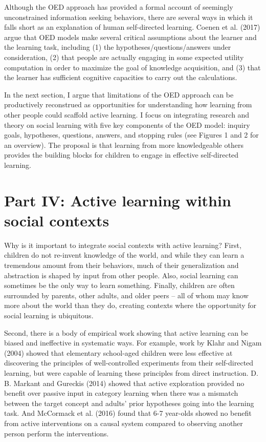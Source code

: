 \documentclass[english,floatsintext,man]{apa6}
\theoremstyle{definition}
\theoremstyle{definition}
\theoremstyle{definition}
\theoremstyle{remark}
\begin{document}
Although the OED approach has provided a formal account of seemingly
unconstrained information seeking behaviors, there are several ways in
which it falls short as an explanation of human self-directed learning.
Coenen et al. (2017) argue that OED models make several critical
assumptions about the learner and the learning task, including (1) the
hypotheses/questions/answers under consideration, (2) that people are
actually engaging in some expected utility computation in order to
maximize the goal of knowledge acquisition, and (3) that the learner has
sufficient cognitive capacities to carry out the calculations.

In the next section, I argue that limitations of the OED approach can be
productively reconstrued as opportunities for understanding how learning
from other people could scaffold active learning. I focus on integrating
research and theory on social learning with five key components of the
OED model: inquiry goals, hypotheses, questions, answers, and stopping
rules (see Figures 1 and 2 for an overview). The proposal is that
learning from more knowledgeable others provides the building blocks for
children to engage in effective self-directed learning.

\hypertarget{p4}{\section{Part IV: Active learning within social
contexts}\label{p4}}

Why is it important to integrate social contexts with active learning?
First, children do not re-invent knowledge of the world, and while they
can learn a tremendous amount from their behaviors, much of their
generalization and abstraction is shaped by input from other people.
Also, social learning can sometimes be the only way to learn something.
Finally, children are often surrounded by parents, other adults, and
older peers -- all of whom may know more about the world than they do,
creating contexts where the opportunity for social learning is
ubiquitous.

Second, there is a body of empirical work showing that active learning
can be biased and ineffective in systematic ways. For example, work by
Klahr and Nigam (2004) showed that elementary school-aged children were
less effective at discovering the principles of well-controlled
experiments from their self-directed learning, but were capable of
learning these principles from direct instruction. D. B. Markant and
Gureckis (2014) showed that active exploration provided no benefit over
passive input in category learning when there was a mismatch between the
target concept and adults' prior hypotheses going into the learning
task. And McCormack et al. (2016) found that 6-7 year-olds showed no
benefit from active interventions on a causal system compared to
observing another person perform the interventions.
\end{document}
